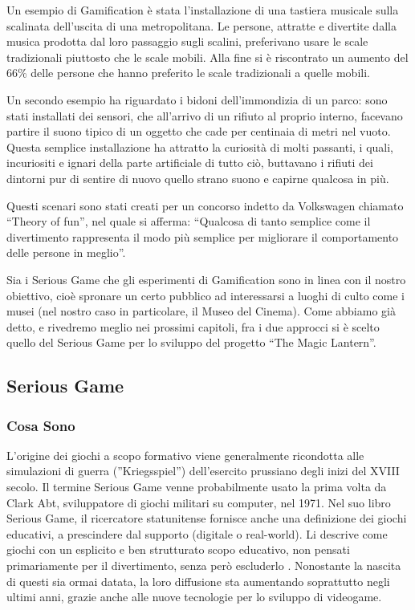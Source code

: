 Un esempio di Gamification è stata l'installazione di una tastiera musicale sulla scalinata dell'uscita di una metropolitana. Le persone, attratte e divertite dalla musica prodotta dal loro passaggio sugli scalini, preferivano usare le scale tradizionali piuttosto che le scale mobili. Alla fine si è riscontrato un aumento del 66\% delle persone che hanno preferito le scale tradizionali a quelle mobili.

Un secondo esempio ha riguardato i bidoni dell'immondizia di un parco: sono stati installati dei sensori, che all'arrivo di un rifiuto al proprio interno, facevano partire il suono tipico di un oggetto che cade per centinaia di metri nel vuoto. Questa semplice installazione ha attratto la curiosità di molti passanti, i quali, incuriositi e ignari della parte artificiale di tutto ciò, buttavano i rifiuti dei dintorni pur di sentire di nuovo quello strano suono e capirne qualcosa in più.

Questi scenari sono stati creati per un concorso indetto da Volkswagen chiamato ``Theory of fun'', nel quale si afferma: ``Qualcosa di tanto semplice come il divertimento rappresenta il modo più semplice per migliorare il comportamento delle persone in meglio''.

Sia i Serious Game che gli esperimenti di Gamification sono in linea con il nostro obiettivo, cioè spronare un certo pubblico ad interessarsi a luoghi di culto come i musei (nel nostro caso in particolare, il Museo del Cinema). Come abbiamo già detto, e rivedremo meglio nei prossimi capitoli, fra i due approcci si è scelto quello del Serious Game per lo sviluppo del progetto ``The Magic Lantern''.

\newpage

\subsection{Serious Game}

\subsubsection{Cosa Sono}
\label{sec:cosasono}

L'origine dei giochi a scopo formativo viene generalmente ricondotta alle simulazioni di guerra (''Kriegsspiel'') dell'esercito prussiano degli inizi del XVIII secolo.
Il termine Serious Game venne probabilmente usato la prima volta da Clark Abt, sviluppatore di giochi militari su computer, nel 1971. Nel suo libro Serious Game, il ricercatore statunitense fornisce anche una definizione dei giochi educativi, a prescindere dal supporto (digitale o real-world). Li descrive come giochi con un esplicito e ben strutturato scopo educativo, non pensati primariamente per il divertimento, senza però escluderlo \cite{wikiseriousgames}.
Nonostante la nascita di questi sia ormai datata, la loro diffusione sta aumentando soprattutto negli ultimi anni, grazie anche alle nuove tecnologie per lo sviluppo di videogame.

